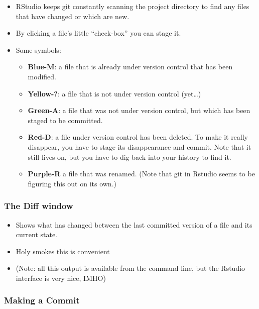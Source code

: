\documentclass[]{book}
\providecommand{\tightlist}{%
  \setlength{\itemsep}{0pt}\setlength{\parskip}{0pt}}
\theoremstyle{definition}
\theoremstyle{definition}
\theoremstyle{remark}
\begin{document}
\begin{itemize}
\tightlist
\item
  RStudio keeps git constantly scanning the project directory to find
  any files that have changed or which are new.
\item
  By clicking a file's little ``check-box'' you can stage it.\\
\item
  Some symbols:

  \begin{itemize}
  \tightlist
  \item
    \textbf{Blue-M}: a file that is already under version control that
    has been modified.
  \item
    \textbf{Yellow-?}: a file that is not under version control
    (yet\ldots{})
  \item
    \textbf{Green-A}: a file that was not under version control, but
    which has been staged to be committed.
  \item
    \textbf{Red-D}: a file under version control has been deleted. To
    make it really disappear, you have to stage its disappearance and
    commit. Note that it still lives on, but you have to dig back into
    your history to find it.
  \item
    \textbf{Purple-R} a file that was renamed. (Note that git in Rstudio
    seems to be figuring this out on its own.)
  \end{itemize}
\end{itemize}

\subsubsection{The Diff window}\label{the-diff-window}

\begin{itemize}
\tightlist
\item
  Shows what has changed between the last committed version of a file
  and its current state.
\item
  Holy smokes this is convenient
\item
  (Note: all this output is available from the command line, but the
  Rstudio interface is very nice, IMHO)
\end{itemize}

\subsubsection{Making a Commit}\label{making-a-commit}
\end{document}
